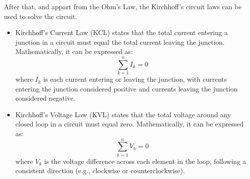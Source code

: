 After that, and appart from the Ohm's Law, the Kirchhoff's circuit laws can be used to solve the circuit.
\begin{itemize}
    \item Kirchhoff's Current Law (KCL) states that the total current entering a junction in a circuit must equal the total current leaving the junction. Mathematically, it can be expressed as:
    \begin{equation*}
        \sum_{k=1}^n I_k = 0
    \end{equation*}
    where $I_k$ is each current entering or leaving the junction, with currents entering the junction considered positive and currents leaving the junction considered negative.
    \item Kirchhoff's Voltage Law (KVL) states that the total voltage around any closed loop in a circuit must equal zero. Mathematically, it can be expressed as:
    \begin{equation*}
        \sum_{k=1}^n V_k = 0
    \end{equation*}
    where $V_k$ is the voltage difference across each element in the loop, following a consistent direction (e.g., clockwise or counterclockwise).
\end{itemize}